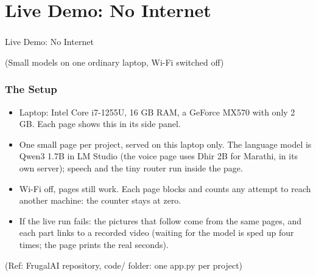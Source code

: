 
\section[Demo]{Live Demo: No Internet}

\begin{frame}[fragile]\frametitle{}
\begin{center}
{\Large Live Demo: No Internet}

\medskip
{\small (Small models on one ordinary laptop, Wi-Fi switched off)}
\end{center}
\end{frame}

\begin{frame}[fragile]\frametitle{The Setup}
\begin{itemize}
\item Laptop: Intel Core i7-1255U, 16 GB RAM, a GeForce MX570 with only 2 GB. Each page shows this in its side panel.
\item One small page per project, served on this laptop only. The language model is Qwen3 1.7B in LM Studio (the voice page uses Dhir 2B for Marathi, in its own server); speech and the tiny router run inside the page.
\item Wi-Fi off, pages still work. Each page blocks and counts any attempt to reach another machine: the counter stays at zero.
\item If the live run fails: the pictures that follow come from the same pages, and each part links to a recorded video (waiting for the model is sped up four times; the page prints the real seconds).
\end{itemize}
{\tiny (Ref: FrugalAI repository, code/ folder: one app.py per project)}
\end{frame}

